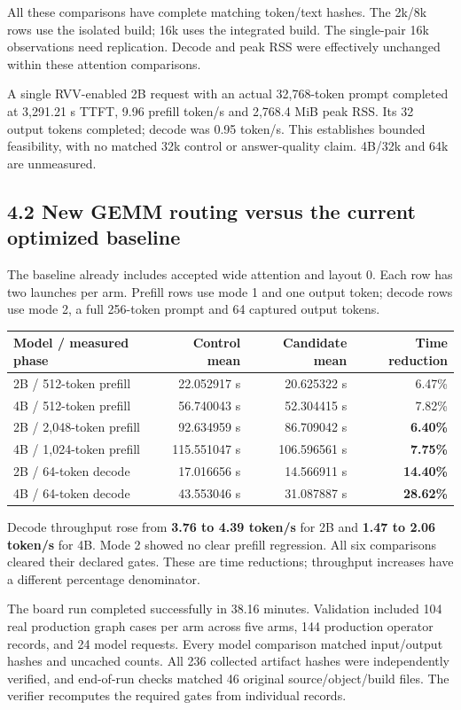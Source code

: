 \documentclass[10pt,a4paper]{article}
\begin{document}
All these comparisons have complete matching token/text hashes. The
2k/8k rows use the isolated build; 16k uses the integrated build. The
single-pair 16k observations need replication. Decode and peak RSS were
effectively unchanged within these attention comparisons.

A single RVV-enabled 2B request with an actual 32,768-token prompt
completed at 3,291.21 s TTFT, 9.96 prefill token/s and 2,768.4 MiB peak
RSS. Its 32 output tokens completed; decode was 0.95 token/s. This
establishes bounded feasibility, with no matched 32k control or
answer-quality claim. 4B/32k and 64k are unmeasured.

\hypertarget{new-gemm-routing-versus-the-current-optimized-baseline}{%
\subsection{4.2 New GEMM routing versus the current optimized
baseline}\label{new-gemm-routing-versus-the-current-optimized-baseline}}

The baseline already includes accepted wide attention and layout 0. Each
row has two launches per arm. Prefill rows use mode 1 and one output
token; decode rows use mode 2, a full 256-token prompt and 64 captured
output tokens.

\begin{longtable}[]{@{}lrrr@{}}
\toprule
Model / measured phase & Control mean & Candidate mean & Time
reduction\tabularnewline
\midrule
\endhead
2B / 512-token prefill & 22.052917 s & 20.625322 s &
6.47\%\tabularnewline
4B / 512-token prefill & 56.740043 s & 52.304415 s &
7.82\%\tabularnewline
2B / 2,048-token prefill & 92.634959 s & 86.709042 s &
\textbf{6.40\%}\tabularnewline
4B / 1,024-token prefill & 115.551047 s & 106.596561 s &
\textbf{7.75\%}\tabularnewline
2B / 64-token decode & 17.016656 s & 14.566911 s &
\textbf{14.40\%}\tabularnewline
4B / 64-token decode & 43.553046 s & 31.087887 s &
\textbf{28.62\%}\tabularnewline
\bottomrule
\end{longtable}

Decode throughput rose from \textbf{3.76 to 4.39 token/s} for 2B and
\textbf{1.47 to 2.06 token/s} for 4B. Mode 2 showed no clear prefill
regression. All six comparisons cleared their declared gates. These are
time reductions; throughput increases have a different percentage
denominator.

The board run completed successfully in 38.16 minutes. Validation
included 104 real production graph cases per arm across five arms, 144
production operator records, and 24 model requests. Every model
comparison matched input/output hashes and uncached counts. All 236
collected artifact hashes were independently verified, and end-of-run
checks matched 46 original source/object/build files. The verifier
recomputes the required gates from individual records.
\end{document}
